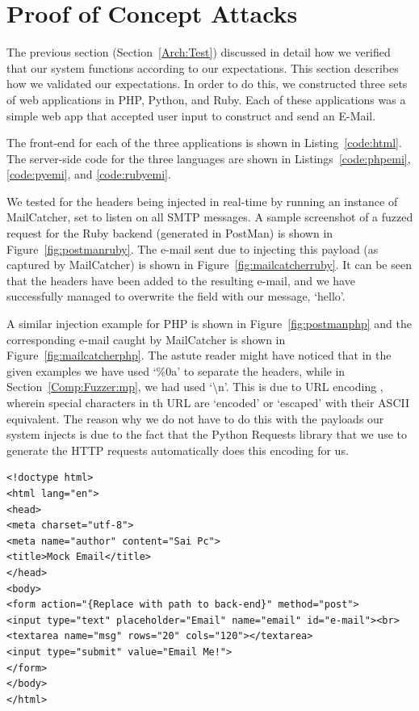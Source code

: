 \section{Proof of Concept Attacks}
The previous section (Section~\ref{Arch:Test}) discussed in detail how we verified that our system functions according to our expectations. This section describes how we validated our expectations. In order to do this, we constructed three sets of web applications in PHP, Python, and Ruby. Each of these applications was a simple web app that accepted user input to construct and send an E-Mail.

The front-end for each of the three applications is shown in Listing~\ref{code:html}. The server-side code for the three languages are shown in Listings~\ref{code:phpemi}, \ref{code:pyemi}, and \ref{code:rubyemi}.

We tested for the headers being injected in real-time by running an instance of MailCatcher, set to listen on all SMTP messages. A sample screenshot of a fuzzed request for the Ruby backend (generated in PostMan) is shown in Figure~\ref{fig:postmanruby}. The e-mail sent due to injecting this payload (as captured by MailCatcher) is shown in Figure~\ref{fig:mailcatcherruby}. It can be seen that the headers have been added to the resulting e-mail, and we have successfully managed to overwrite the  field with our message, `hello'.

A similar injection example for PHP is shown in Figure~\ref{fig:postmanphp} and the corresponding e-mail caught by MailCatcher is shown in Figure~\ref{fig:mailcatcherphp}. The astute reader might have noticed that in the given examples we have used `\%0a' to separate the headers, while in Section~\ref{Comp:Fuzzer:mp}, we had used `\textbackslash{}n'. This is due to URL encoding \cite{rfc1738}, wherein special characters in th URL are `encoded' or `escaped' with their ASCII equivalent.
The reason why we do not have to do this with the payloads our system injects is due to the fact that the Python Requests library that we use to generate the HTTP requests automatically does this encoding for us.

\begin{lstlisting}
<!doctype html>
<html lang="en">
<head>
<meta charset="utf-8">
<meta name="author" content="Sai Pc">
<title>Mock Email</title>
</head>
<body>
<form action="{Replace with path to back-end}" method="post">
<input type="text" placeholder="Email" name="email" id="e-mail"><br>
<textarea name="msg" rows="20" cols="120"></textarea>
<input type="submit" value="Email Me!">
</form>
</body>
</html>
\end{lstlisting}

